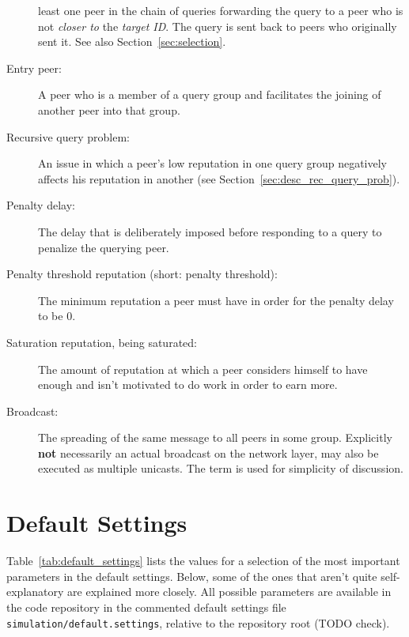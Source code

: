\begin{description}
least one peer in the chain of queries forwarding the query to a peer who is not
\emph{closer to} the \emph{target ID}. The query is sent back to peers who
originally sent it. See also Section~\ref{sec:selection}.
\item[Entry peer:] A peer who is a member of a query group and facilitates the
joining of another peer into that group.
\item[Recursive query problem:] An issue in which a peer's low reputation in one
query group negatively affects his reputation in another (see
Section~\ref{sec:desc_rec_query_prob}).
\item[Penalty delay:] The delay that is deliberately imposed before responding
to a query to penalize the querying peer.
\item[Penalty threshold reputation (short: penalty threshold):] The minimum
reputation a peer must have in order for the penalty delay to be 0.
\item[Saturation reputation, being saturated:] The amount of reputation at which
a peer considers himself to have enough and isn't motivated to do work in order
to earn more.
\item[Broadcast:] The spreading of the same message to all peers in some group.
Explicitly \textbf{not} necessarily an actual broadcast on the network layer,
may also be executed as multiple unicasts. The term is used for simplicity of
discussion.
\end{description}

\section{Default Settings}
\label{sec:app_default_settings}
Table~\ref{tab:default_settings} lists the values for a selection of the most
important parameters in the default settings. Below, some of the ones that
aren't quite self-explanatory are explained more closely. All possible
parameters are available in the code repository in the commented default
settings file \texttt{simulation/default.settings}, relative to the repository
root (TODO check).

